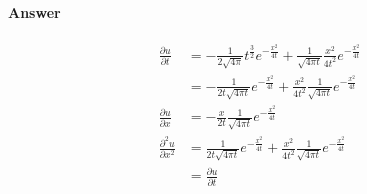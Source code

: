 \paragraph{Answer}
\begin{align*}
    \frac{\partial u}{\partial t}
        &= -\frac{1}{2 \sqrt{4 \pi}} t^{\frac{3}{2}} e^{-\frac{x^2}{4 t}} +
            \frac{1}{\sqrt{4 \pi t}} \frac{x^2}{4 t^2} e^{-\frac{x^2}{4 t}} \\
        &= -\frac{1}{2 t \sqrt{4 \pi t}} e^{-\frac{x^2}{4 t}} +
            \frac{x^2}{4 t^2} \frac{1}{\sqrt{4 \pi t}} e^{-\frac{x^2}{4 t}} \\
    \frac{\partial u}{\partial x}
        &= -\frac{x}{2 t} \frac{1}{\sqrt{4 \pi t}} e^{-\frac{x^2}{4 t}} \\
    \frac{\partial^2 u}{\partial x^2}
        &= \frac{1}{2 t \sqrt{4 \pi t}} e^{-\frac{x^2}{4 t}} +
            \frac{x^2}{4 t^2} \frac{1}{\sqrt{4 \pi t}} e^{-\frac{x^2}{4 t}} \\
        &= \frac{\partial u}{\partial t}
\end{align*}
